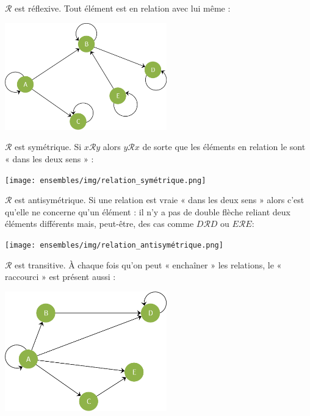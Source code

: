\begin{exemple}[s]

    $\mathcal{R}$ est réflexive. Tout élément est en relation avec lui même :
    \begin{center}
        \includegraphics[width=7cm]{ensembles/img/relation_reflexive}
    \end{center}


    $\mathcal{R}$ est symétrique. Si $x\mathcal{R}y$ alors $y\mathcal{R}x$ de sorte que les éléments en relation le sont « dans les deux sens » :

    \begin{center}
        \texttt{[image: ensembles/img/relation\_symétrique.png]}
    \end{center}


    $\mathcal{R}$ est antisymétrique. Si une relation est vraie « dans les deux sens »  alors c'est qu'elle ne concerne qu'un élément : il n'y a pas de double flèche reliant deux éléments différents mais, peut-être, des cas comme $D\mathcal{R}D$ ou $E\mathcal{R}E$:
    \begin{center}
        \texttt{[image: ensembles/img/relation\_antisymétrique.png]}
    \end{center}


    $\mathcal{R}$ est transitive. À chaque fois qu'on peut « enchaîner »  les relations, le « raccourci »  est présent aussi :
    \begin{center}
        \includegraphics[width=7cm]{ensembles/img/relation_transitive.png}
    \end{center}
\end{exemple}

